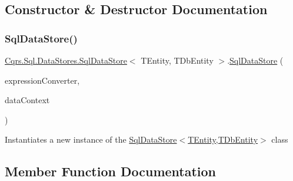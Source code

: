 \subsection{Constructor \& Destructor Documentation}
\mbox{\label{classCqrs_1_1Sql_1_1DataStores_1_1SqlDataStore_a3ddc911126acbde0353e7773ddfa8acc_a3ddc911126acbde0353e7773ddfa8acc}} 
\subsubsection{\texorpdfstring{Sql\+Data\+Store()}{SqlDataStore()}}
{\footnotesize\ttfamily \hyperlink{classCqrs_1_1Sql_1_1DataStores_1_1SqlDataStore}{Cqrs.\+Sql.\+Data\+Stores.\+Sql\+Data\+Store}$<$ T\+Entity, T\+Db\+Entity $>$.\hyperlink{classCqrs_1_1Sql_1_1DataStores_1_1SqlDataStore}{Sql\+Data\+Store} (\begin{DoxyParamCaption}\item[{\hyperlink{interfaceCqrs_1_1Sql_1_1DataStores_1_1IExpressionTreeConverter}{I\+Expression\+Tree\+Converter}}]{expression\+Converter,  }\item[{Data\+Context}]{data\+Context }\end{DoxyParamCaption})}



Instantiates a new instance of the \hyperlink{classCqrs_1_1Sql_1_1DataStores_1_1SqlDataStore_a3ddc911126acbde0353e7773ddfa8acc_a3ddc911126acbde0353e7773ddfa8acc}{Sql\+Data\+Store$<$\+T\+Entity,\+T\+Db\+Entity$>$} class 



\subsection{Member Function Documentation}
\mbox{\label{classCqrs_1_1Sql_1_1DataStores_1_1SqlDataStore_a715ab041546e864cb9551d165c240f33_a715ab041546e864cb9551d165c240f33}} 
